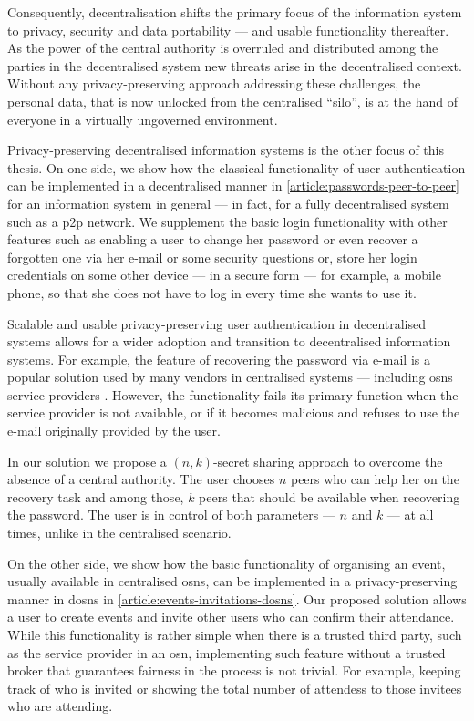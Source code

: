 \documentclass[showtrims,oldfontcommands]{kthesis}
\begin{document}
Consequently, decentralisation shifts the primary focus of the information system 
to privacy, security and data portability --- and usable functionality thereafter. 
As the power of the central authority is overruled and distributed among the parties 
in the decentralised system new threats arise in the decentralised context. Without 
any privacy-preserving approach addressing these challenges, the personal data, 
that is now unlocked from the centralised ``silo'', is at the hand of everyone in 
a virtually ungoverned environment.

Privacy-preserving decentralised information systems is the other focus of this 
thesis. On one side, we show how the classical functionality of user authentication 
can be implemented in a decentralised manner in \cref{article:passwords-peer-to-peer} 
for an information system in general --- in fact, for a fully decentralised system 
such as a \ac{p2p} network. We supplement the basic login functionality with other 
features such as enabling a user to change her password or even recover a forgotten 
one via her e-mail or some security questions or, store her login credentials on 
some other device --- in a secure form --- for example, a mobile phone, so that 
she does not have to log in every time she wants to use it.

Scalable and usable privacy-preserving user authentication in decentralised systems 
allows for a wider adoption and transition to decentralised information systems. 
For example, the feature of recovering the password via e-mail is a popular solution 
used by many vendors in centralised systems --- including \acp{osn} service providers 
\cite{Kuzma11}. However, the functionality fails its primary function when the service 
provider is not available, or if it becomes malicious and refuses to use the e-mail 
originally provided by the user. 

In our solution we propose a $(n, k)$-secret sharing approach to overcome the absence 
of a central authority. The user chooses $n$ peers who can help her on the recovery 
task and among those, $k$ peers that should be available when recovering the password. 
The user is in control of both parameters --- $n$ and $k$ ---  at all times, unlike 
in the centralised scenario.

On the other side, we show how the basic functionality of organising an event, usually 
available in centralised \acp{osn}, can be implemented in a privacy-preserving manner 
in \acp{dosn} in \cref{article:events-invitations-dosns}. Our proposed solution 
allows a user to create events and invite other users who can confirm their attendance. 
While this functionality is rather simple when there is a trusted third party, such as 
the service provider in an \ac{osn}, implementing such feature without a trusted 
broker that guarantees fairness in the process is not trivial. For example, keeping 
track of who is invited or showing the total number of attendess to those invitees 
who are attending.
\end{document}
